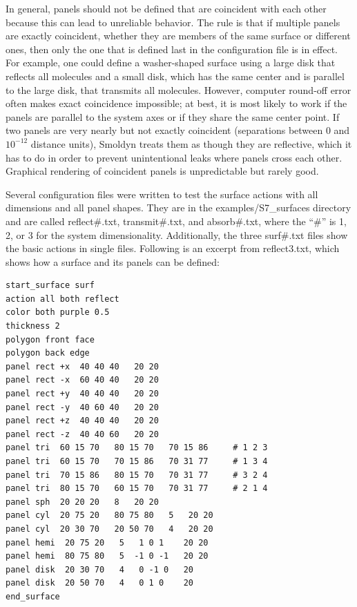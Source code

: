 \documentclass {scrbook}
\begin{document}
In general, panels should not be defined that are coincident with each other because this can lead to unreliable behavior. The rule is that if multiple panels are exactly coincident, whether they are members of the same surface or different ones, then only the one that is defined last in the configuration file is in effect. For example, one could define a washer-shaped surface using a large disk that reflects all molecules and a small disk, which has the same center and is parallel to the large disk, that transmits all molecules. However, computer round-off error often makes exact coincidence impossible; at best, it is most likely to work if the panels are parallel to the system axes or if they share the same center point. If two panels are very nearly but not exactly coincident (separations between 0 and $10^{-12}$ distance units), Smoldyn treats them as though they are reflective, which it has to do in order to prevent unintentional leaks where panels cross each other. Graphical rendering of coincident panels is unpredictable but rarely good.

Several configuration files were written to test the surface actions with all dimensions and all panel shapes. They are in the examples/S7\_surfaces directory and are called reflect\#.txt, transmit\#.txt, and absorb\#.txt, where the ``\#'' is 1, 2, or 3 for the system dimensionality. Additionally, the three surf\#.txt files show the basic actions in single files. Following is an excerpt from reflect3.txt, which shows how a surface and its panels can be defined:

\begin{lstlisting}[style=SSAC]
start_surface surf
action all both reflect
color both purple 0.5
thickness 2
polygon front face
polygon back edge
panel rect +x  40 40 40   20 20
panel rect -x  60 40 40   20 20
panel rect +y  40 40 40   20 20
panel rect -y  40 60 40   20 20
panel rect +z  40 40 40   20 20
panel rect -z  40 40 60   20 20
panel tri  60 15 70   80 15 70   70 15 86     # 1 2 3
panel tri  60 15 70   70 15 86   70 31 77     # 1 3 4
panel tri  70 15 86   80 15 70   70 31 77     # 3 2 4
panel tri  80 15 70   60 15 70   70 31 77     # 2 1 4
panel sph  20 20 20   8   20 20
panel cyl  20 75 20   80 75 80   5   20 20
panel cyl  20 30 70   20 50 70   4   20 20
panel hemi  20 75 20   5   1 0 1    20 20
panel hemi  80 75 80   5  -1 0 -1   20 20
panel disk  20 30 70   4   0 -1 0   20
panel disk  20 50 70   4   0 1 0    20
end_surface
\end{lstlisting}
\end{document}
